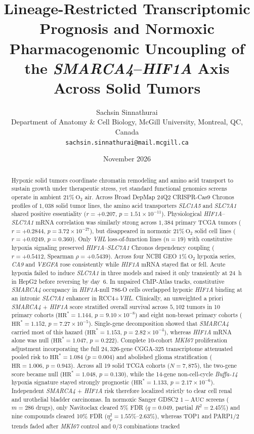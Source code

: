 \documentclass[10pt,twocolumn]{article}
\title{\textbf{Lineage-Restricted Transcriptomic Prognosis and Normoxic Pharmacogenomic Uncoupling of the \textit{SMARCA4}--\textit{HIF1A} Axis Across Solid Tumors}}
\author{Sachsin Sinnathurai\\
Department of Anatomy \& Cell Biology, McGill University, Montreal, QC, Canada\\
\texttt{sachsin.sinnathurai@mail.mcgill.ca}}
\date{November 2026}
\begin{document}
\raggedbottom
\setlength{\abovedisplayskip}{5pt plus 1pt minus 1pt}
\setlength{\belowdisplayskip}{5pt plus 1pt minus 1pt}
\setlength{\abovedisplayshortskip}{3pt}
\setlength{\belowdisplayshortskip}{3pt}
\maketitle

\begin{abstract}
Hypoxic solid tumors coordinate chromatin remodeling and amino acid transport to sustain growth under therapeutic stress, yet standard functional genomics screens operate in ambient $21\%\ \text{O}_2$ air. Across Broad DepMap 24Q2 CRISPR-Cas9 Chronos profiles of $1,038$ solid tumor lines, the amino acid transporters \textit{SLC1A5} and \textit{SLC7A1} shared positive essentiality ($r = +0.207$, $p = 1.51 \times 10^{-11}$). Physiological \textit{HIF1A}--\textit{SLC7A1} mRNA correlation was similarly strong across $1,384$ primary TCGA tumors ($r = +0.2844$, $p = 3.72 \times 10^{-27}$), but disappeared in normoxic $21\%\ \text{O}_2$ solid cell lines ($r = +0.0249$, $p = 0.360$). Only \textit{VHL} loss-of-function lines ($n = 19$) with constitutive hypoxia signaling preserved \textit{HIF1A}--\textit{SLC7A1} Chronos dependency coupling ($r = +0.5412$, Spearman $\rho = +0.5439$). Across four NCBI GEO $1\%\ \text{O}_2$ hypoxia series, \textit{CA9} and \textit{VEGFA} rose consistently while \textit{HIF1A} mRNA stayed flat or fell. Acute hypoxia failed to induce \textit{SLC7A1} in three models and raised it only transiently at 24~h in HepG2 before reversing by day~6. In unpaired ChIP-Atlas tracks, constitutive \textit{SMARCA4} occupancy in \textit{HIF1A}-null 786-O cells overlapped hypoxic \textit{HIF1A} binding at an intronic \textit{SLC7A1} enhancer in RCC4+\textit{VHL}. Clinically, an unweighted a priori \textit{SMARCA4} + \textit{HIF1A} score stratified overall survival across $5,102$ tumors in 10 primary cohorts ($\text{HR}^* = 1.144$, $p = 9.10 \times 10^{-8}$) and eight non-breast primary cohorts ($\text{HR}^* = 1.152$, $p = 7.27 \times 10^{-5}$). Single-gene decomposition showed that \textit{SMARCA4} carried most of this hazard ($\text{HR}^* = 1.153$, $p = 2.82 \times 10^{-4}$), whereas \textit{HIF1A} mRNA alone was null ($\text{HR}^* = 1.047$, $p = 0.222$). Complete 10-cohort \textit{MKI67} proliferation adjustment incorporating the full $24,326$-gene CGGA-325 transcriptome attenuated pooled risk to $\text{HR}^* = 1.084$ ($p = 0.004$) and abolished glioma stratification ($\text{HR} = 1.006$, $p = 0.943$). Across all 19 solid TCGA cohorts ($N = 7,875$), the two-gene score became null ($\text{HR}^* = 1.048$, $p = 0.130$), while the 14-gene non-cell-cycle \textit{Buffa-14} hypoxia signature stayed strongly prognostic ($\text{HR}^* = 1.133$, $p = 2.17 \times 10^{-6}$). Independent \textit{SMARCA4} + \textit{HIF1A} risk therefore localized strictly to clear cell renal and urothelial bladder carcinomas. In normoxic Sanger GDSC2 $1 - \text{AUC}$ screens ($m = 286$ drugs), only Navitoclax cleared 5\% FDR ($q = 0.049$, partial $R^2 = 2.45\%$) and nine compounds cleared 10\% FDR ($\eta_p^2 = 1.55\%\text{--}2.63\%$), whereas TOP1 and PARP1/2 trends faded after \textit{MKI67} control and $0/3$ combinations tracked 
\end{abstract}
\end{document}
